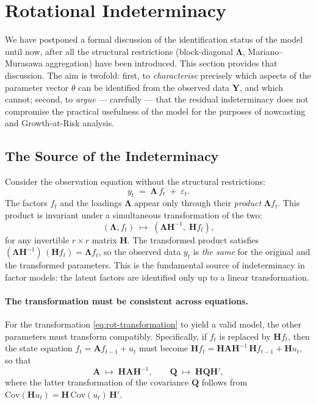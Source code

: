 \documentclass[11pt, a4paper, oneside]{article}
\newcommand{\mL}{\boldsymbol{\Lambda}}
\begin{document}
\newpage

\section{Rotational Indeterminacy}
\label{sec:rotational-indeterminacy}

We have postponed a formal discussion of the identification status of
the model until now, after all the structural restrictions
(block-diagonal $\mL$, Mariano–Murasawa aggregation) have
been introduced. This section provides that discussion. The aim is
twofold: first, to \emph{characterise} precisely which aspects of the
parameter vector $\theta$ can be identified from the observed data
$\mathbf{Y}$, and which cannot; second, to \emph{argue} — carefully —
that the residual indeterminacy does not compromise the practical
usefulness of the model for the purposes of nowcasting and
Growth-at-Risk analysis.

\subsection{The Source of the Indeterminacy}
\label{subsec:rot-source}

Consider the observation equation without the structural restrictions:
\[
y_t \;=\; \mL\, f_t \;+\; \varepsilon_t.
\]
The factors $f_t$ and the loadings $\mL$ appear only
through their \emph{product} $\mL f_t$. This product is
invariant under a simultaneous transformation of the two:
\begin{equation}
(\mL, f_t) \;\longmapsto\; (\mL \mathbf{H}^{-1},\; \mathbf{H} f_t),
\label{eq:rot-transformation}
\end{equation}
for any invertible $r \times r$ matrix $\mathbf{H}$. The transformed
product satisfies $(\mL \mathbf{H}^{-1})\, (\mathbf{H} f_t) = \mL f_t$,
so the observed data $y_t$ is \emph{the same} for the original and the
transformed parameters. This is the fundamental source of
indeterminacy in factor models: the latent factors are identified only
up to a linear transformation.

\paragraph{The transformation must be consistent across equations.}
For the transformation \eqref{eq:rot-transformation} to yield a valid
model, the other parameters must transform compatibly. Specifically,
if $f_t$ is replaced by $\mathbf{H} f_t$, then the state equation
$f_t = \mathbf{A} f_{t-1} + u_t$ must become
$\mathbf{H} f_t = \mathbf{H} \mathbf{A} \mathbf{H}^{-1}\, \mathbf{H} f_{t-1} + \mathbf{H} u_t$,
so that
\begin{equation}
\mathbf{A} \;\longmapsto\; \mathbf{H} \mathbf{A} \mathbf{H}^{-1},
\qquad
\mathbf{Q} \;\longmapsto\; \mathbf{H} \mathbf{Q} \mathbf{H}',
\label{eq:rot-AQ-transformation}
\end{equation}
where the latter transformation of the covariance $\mathbf{Q}$ follows
from $\mathrm{Cov}(\mathbf{H} u_t) = \mathbf{H}\, \mathrm{Cov}(u_t)\, \mathbf{H}'$.
\end{document}
